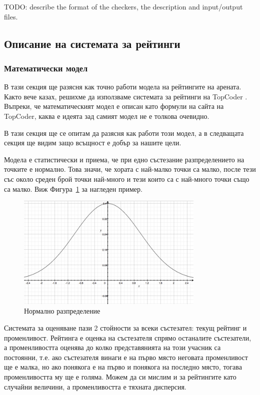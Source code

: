 \documentclass[a4paper,12pt]{article}
\begin{document}
    TODO: describe the format of the checkers, the description and input/output files.
  \subsection{Описание на системата за рейтинги}
  
  
  \subsubsection{Математически модел}
  В тази секция ще разясня как точно работи модела на рейтингите на арената. Както вече казах, решихме да използваме системата за рейтинги на TopCoder \cite{topcoder_ratings}. Въпреки, че математическият модел е описан като формули на сайта на TopCoder, каква е идеята зад самият модел не е толкова очевидно.

  В тази секция ще се опитам да разясня как работи този модел, а в следващата секция ще видим защо всъщност е добър за нашите цели.
  
  Модела е статистически и приема, че при едно състезание разпределението на точките е нормално. Това значи, че хората с най-малко точки са малко, после тези със около среден брой точки най-много и тези които са с най-много точки също са малко. Виж Фигура~\ref{normal_distribution} за нагледен пример.
  
  \begin{figure}
    \begin{center}
      \includegraphics[width=0.8\textwidth]{images/normal_distribution.png}
    \end{center}
    \caption{Нормално разпределение}
    \label{normal_distribution}
  \end{figure}
  
  Системата за оценяване пази 2 стойности за всеки състезател: текущ рейтинг и променливост. Рейтинга е оценка на състезателя спрямо останалите състезатели, а променливостта оценява до колко представянията на този учасник са постоянни, т.е. ако състезателя винаги е на първо място неговата променливост ще е малка, но ако понякога е на първо и понякога на последно място, тогава променливостта му ще е голяма. Можем да си мислим и за рейтингите като случайни величини, а променливостта е тяхната дисперсия. 
  
\end{document}
